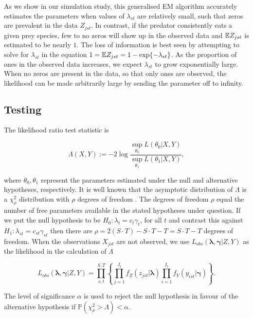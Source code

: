 \documentclass[smallextended]{svjour3}
\begin{document}
As we show in our simulation study, this generalised EM algorithm accurately estimates the parameters when values of $\lambda_{st}$ are relatively small, such that zeros are prevalent in the data $Z_{jst}$.  In contrast, if the predator consistently eats a given prey species, few to no zeros will show up in the observed data and $\mathbb{E} Z_{jst}$ is estimated to be nearly $1$.  The loss of information is best seen by attempting to solve for $\lambda_{st}$ in the equation $1 = \mathbb{E} Z_{jst} = 1 - \exp\{-\lambda_{st}\}$.  As the proportion of ones in the observed data increases, we expect $\lambda_{st}$ to grow exponentially large.  When no zeros are present in the data, so that only ones are observed, the likelihood can be made arbitrarily large by sending the parameter off to infinity.  

\subsection{Testing}
\label{sec:test}
The likelihood ratio test statistic is

\begin{equation*}
  \label{eq:LRT}
    \Lambda(X,Y) := -2 \log{ \frac{ \sup_{\theta_0} L(\theta_0|X,Y)}{ \sup_{\theta_1} L(\theta_1|X,Y)} },
\end{equation*}

\noindent where $\theta_0, \theta_1$ represent the parameters estimated under the null and alternative hypotheses, respectively.  It is well known that the asymptotic distribution of $\Lambda$ is a $\chi_{\rho}^2$ distribution with $\rho$ degrees of freedom \citep{Wilks:1938}.  The degrees of freedom $\rho$ equal the number of free parameters available in the stated hypotheses under question.  If we put the null hypothesis to be $H_0: \lambda_t = c_t \gamma_t$, for all $t$ and contrast this against $H_1: \lambda_{st} = c_{st}\gamma_{st}$ then there are $\rho = 2(S \cdot T) - S \cdot T - T = S \cdot T - T$ degrees of freedom.  When the observations $X_{jst}$ are not observed, we use $L_{obs}(\boldsymbol{\lambda}, \boldsymbol{\gamma}|Z,Y)$ as the likelihood in the calculation of $\Lambda$

\[ L_{obs}(\boldsymbol{\lambda}, \boldsymbol{\gamma}|Z,Y) = \prod_{s,t}^{S,T} \left\{ \prod_{j=1}^{J_t}f_Z(z_{jst}|\boldsymbol{\lambda}) \prod_{i=1}^{I_t}f_Y(y_{ist}|\boldsymbol{\gamma}) \right\}. \]

\noindent The level of significance $\alpha$ is used to reject the null hypothesis in favour of the alternative hypothesis if $\mathbb{P}(\chi^2_{\rho} > \Lambda) < \alpha$.  
\end{document}
